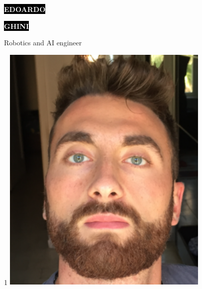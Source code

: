 \documentclass[9pt]{developercv} %
\begin{document}
\def\photo{0}


\begin{minipage}[t]{0.41\textwidth} %
	\vspace{-\baselineskip} %
	
	\colorbox{black}{{\HUGE\textcolor{white}{\textbf{\MakeUppercase{Edoardo}}}}} %
	
	\colorbox{black}{{\HUGE\textcolor{white}{\textbf{\MakeUppercase{Ghini}}}}} %
	
	\vspace{6pt}
	
	{\huge Robotics and AI engineer} %
\end{minipage}
\hfill %
\begin{minipage}[t]{0.215\textwidth} %
	\vspace{-\baselineskip} %
        \if\photo1
          \includegraphics[width=0.75\textwidth]{meCropped}
        \fi
\end{minipage}
\end{document}
